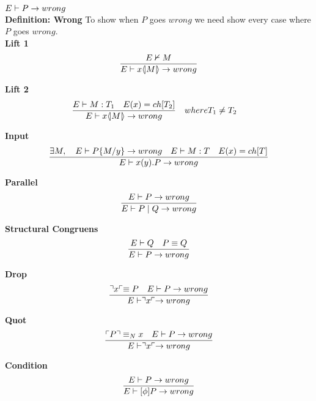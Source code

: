 \begin{theorem}[Wrong]
\ensuremath{E \vdash P \ra wrong} \\
\textbf{Definition: Wrong}
To show when \ensuremath{P} goes \ensuremath{wrong} we need show every case where \ensuremath{P} goes \ensuremath{wrong}.\\
\textbf{Lift 1} \begin{align*}
\frac{E \nvdash M}{E \vdash x \langle \! | M | \! \rangle \rightarrow wrong}
\end{align*}

\textbf{Lift 2} \begin{align*}
\frac{E \vdash M:T_1 \quad E(x)=ch[T_2]}{E \vdash x \langle \! | M | \! \rangle \rightarrow wrong} &\quad where T_1 \neq T_2
\end{align*}

\textbf{Input} \begin{align*}
\frac{\exists M,\quad E \vdash P\{ M/ y\} \rightarrow wrong \quad E \vdash M:T \quad E(x)= ch[T]} {E \vdash x(y).P \rightarrow wrong}\\
\end{align*}

\textbf{Parallel} \begin{align*}
\frac{E \vdash P \rightarrow wrong}{E \vdash P \mid Q \rightarrow wrong}
\end{align*}

\textbf{Structural Congruens} \begin{align*}
\frac{E \vdash Q \quad P \equiv Q}{E \vdash P \rightarrow wrong}
\end{align*}

\textbf{Drop}\begin{align*}
\frac{\urcorner x \ulcorner \equiv P \quad E \vdash P \rightarrow wrong}{E \vdash \urcorner x \ulcorner \rightarrow wrong}
\end{align*}

\textbf{Quot}\begin{align*}
\frac{\ulcorner P \urcorner \equiv _N x \quad E \vdash P \rightarrow wrong}{E \vdash \urcorner x \ulcorner \rightarrow wrong}
\end{align*}

\textbf{Condition}\begin{align*}
\frac{E \vdash P \rightarrow wrong}{E \vdash [\phi]P \rightarrow wrong}
\end{align*}


\end{theorem}

